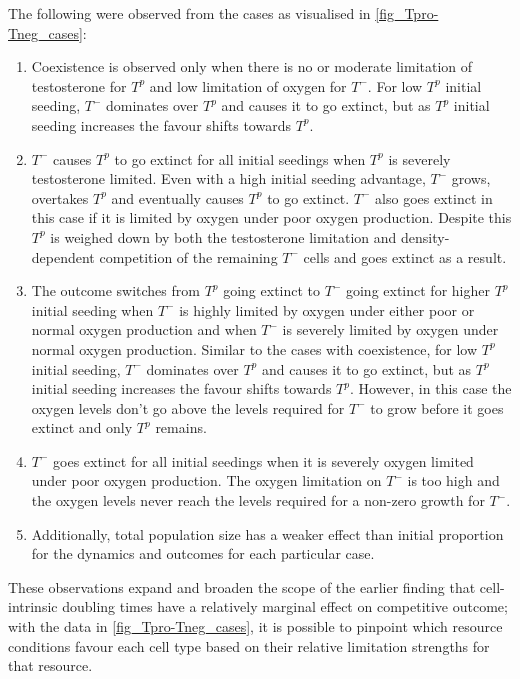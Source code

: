 The following were observed from the cases as visualised in \autoref{fig_Tpro-Tneg_cases}:
\begin{enumerate}
  \item Coexistence is observed only when there is no or moderate limitation of testosterone for $T^p$ and low limitation of oxygen for $T^-$. For low $T^p$ initial seeding, $T^-$ dominates over $T^p$ and causes it to go extinct, but as $T^p$ initial seeding increases the favour shifts towards $T^p$.
  \item $T^-$ causes $T^p$ to go extinct for all initial seedings when $T^p$ is severely testosterone limited. Even with a high initial seeding advantage, $T^-$ grows, overtakes $T^p$ and eventually causes $T^p$ to go extinct. $T^-$ also goes extinct in this case if it is limited by oxygen under poor oxygen production. Despite this $T^p$ is weighed down by both the testosterone limitation and density-dependent competition of the remaining $T^-$ cells and goes extinct as a result.
  \item The outcome switches from $T^p$ going extinct to $T^-$ going extinct for higher $T^p$ initial seeding when $T^-$ is highly limited by oxygen under either poor or normal oxygen production and when $T^-$ is severely limited by oxygen under normal oxygen production. Similar to the cases with coexistence, for low $T^p$ initial seeding, $T^-$ dominates over $T^p$ and causes it to go extinct, but as $T^p$ initial seeding increases the favour shifts towards $T^p$. However, in this case the oxygen levels don’t go above the levels required for $T^-$ to grow before it goes extinct and only $T^p$ remains.
  \item $T^-$ goes extinct for all initial seedings when it is severely oxygen limited under poor oxygen production. The oxygen limitation on $T^-$ is too high and the oxygen levels never reach the levels required for a non-zero growth for $T^-$.
  \item Additionally, total population size has a weaker effect than initial proportion for the dynamics and outcomes for each particular case.
\end{enumerate}

These observations expand and broaden the scope of the earlier finding that cell-intrinsic doubling times have a relatively marginal effect on competitive outcome; with the data in \autoref{fig_Tpro-Tneg_cases}, it is possible to pinpoint which resource conditions favour each cell type based on their relative limitation strengths for that resource.

